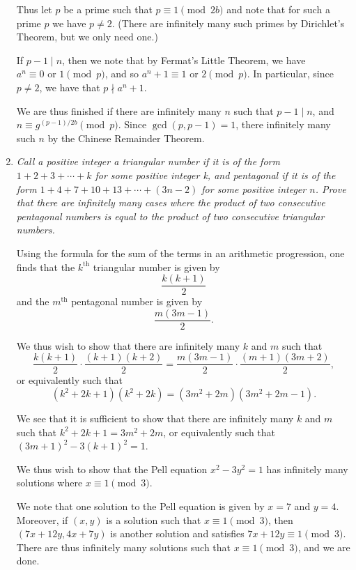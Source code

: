 \documentclass{article}
\begin{document}
\begin{enumerate}[1.]
Thus let $p$ be a prime such that $p \equiv 1 \pmod{2b}$ and note that for such a prime $p$ we have $p \neq 2$. (There are infinitely many such primes by Dirichlet's Theorem, but we only need one.)

If $p - 1 \mid n$, then we note that by Fermat's Little Theorem, we have $a^n \equiv 0 \text{ or } 1 \pmod p$, and so $a^n + 1 \equiv 1 \text{ or } 2 \pmod p$. In particular, since $p \neq 2$, we have that $p \nmid a^n + 1$. 

We are thus finished if there are infinitely many $n$ such that $p - 1 \mid n$, and $n \equiv g^{(p - 1)/2b} \pmod p$. Since $\gcd(p, p - 1) = 1$, there infinitely many such $n$ by the Chinese Remainder Theorem.

\vspace{6pt}
\item %
{\itshape Call a positive integer a \emph{triangular} number if it is of the form $1 +2 +3 +\dotsb +k$ for some positive integer k, and \emph{pentagonal} if it is of the form $1 +4 +7 +10 +13 +\dotsb +(3n-2)$ for some positive integer $n$. Prove that there are infinitely many cases where the product of two consecutive pentagonal numbers is equal to the product of two consecutive triangular numbers.}

Using the formula for the sum of the terms in an arithmetic progression, one finds that the $k^\text{th}$ triangular number is given by
\[
	\frac{k(k + 1)}{2}
\]
and the $m^\text{th}$ pentagonal number is given by
\[
	\frac{m(3m - 1)}{2}.
\]

We thus wish to show that there are infinitely many $k$ and $m$ such that
\[
	\frac{k(k + 1)}{2} \cdot \frac{(k + 1)(k + 2)}{2} = \frac{m(3m - 1)}{2} \cdot \frac{(m + 1)(3m + 2)}{2},
\]
or equivalently such that
\[
	(k^2 + 2k + 1)(k^2 + 2k) = (3m^2 + 2m)(3m^2 + 2m - 1).
\]

We see that it is sufficient to show that there are infinitely many $k$ and $m$ such that $k^2 + 2k + 1 = 3m^2 + 2m$, or equivalently such that ${(3m + 1)}^2 - 3{(k + 1)}^2 = 1$.

We thus wish to show that the Pell equation $x^2 - 3y^2 = 1$ has infinitely many solutions where $x \equiv 1 \pmod 3$.

We note that one solution to the Pell equation is given by $x = 7$ and $y = 4$. Moreover, if $(x, y)$ is a solution such that $x \equiv 1 \pmod 3$, then $(7x + 12y, 4x + 7y)$ is another solution and satisfies $7x + 12y \equiv 1 \pmod 3$. There are thus infinitely many solutions such that $x \equiv 1 \pmod 3$, and we are done.


\end{enumerate}
\end{document}
